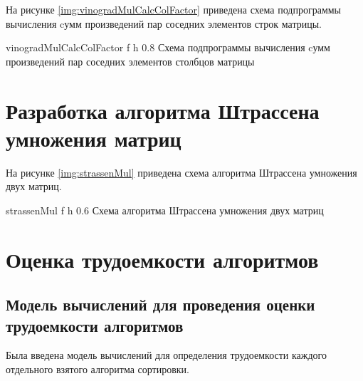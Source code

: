 \clearpage

На рисунке \ref{img:vinogradMulCalcColFactor} приведена схема подпрограммы вычисления cумм произведений пар соседних элементов строк матрицы.

{vinogradMulCalcColFactor} %
{f} %
{h} %
{0.8\textwidth} %
{Схема подпрограммы вычисления cумм произведений пар соседних элементов столбцов матрицы} %

\clearpage

\section{Разработка алгоритма Штрассена умножения матриц}

На рисунке \ref{img:strassenMul} приведена схема алгоритма Штрассена умножения двух матриц.

{strassenMul} %
{f} %
{h} %
{0.6\textwidth} %
{Схема алгоритма Штрассена умножения двух матриц} %

\clearpage

\section{Оценка трудоемкости алгоритмов}

\subsection{Модель вычислений для проведения оценки трудоемкости алгоритмов}

Была введена модель вычислений для определения трудоемкости каждого отдельного взятого алгоритма сортировки.

